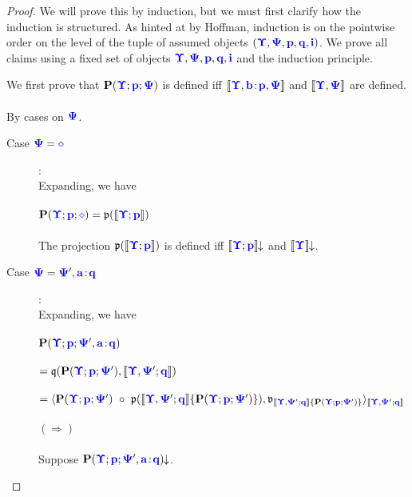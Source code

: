 \documentclass{article}
\newcommand{\blu}[1]{\mathbf{\color{blue}{#1}}}
\newcommand{\mbf}{\mathbf}
\newcommand{\sem}[1]{\llbracket #1 \rrbracket}
\newcommand{\isdef}{\! \! \downarrow}
\begin{document}
\begin{proof}
We will prove this by induction, but we must first clarify how the induction is structured. As hinted at by Hoffman, induction is on the pointwise order on the level of the tuple of assumed objects $(\blu{\Upsilon},\blu{\Psi},\blu{p},\blu{q},\blu{i})$. We prove all claims using a fixed set of objects $\blu{\Upsilon},\blu{\Psi},\blu{p},\blu{q},\blu{i}$ and the induction principle.

We first prove that $\mbf{P}(\blu{\Upsilon};\blu{p};\blu{\Psi})$ is defined iff $\sem{\blu{\Upsilon}, \blu{b \! : \! p}, \blu{\Psi}}$ and $\sem{\blu{\Upsilon}, \blu{\Psi}}$ are defined.\\~\\
By cases on $\blu{\Psi}$.
\begin{description}
\item[Case $\blu{\Psi} = \blu{\diamond}$]:~\\
Expanding, we have\\~\\
$\mbf{P}(\blu{\Upsilon};\blu{p};\blu{\diamond}) = \frak p(\sem{\blu{\Upsilon};\blu{p}})$\\~\\
The projection $\frak p(\sem{\blu{\Upsilon};\blu{p}})$ is defined iff $\sem{\blu{\Upsilon};\blu{p}} \isdef$ and $\sem{\blu{\Upsilon}} \isdef$.
\item[Case $\blu{\Psi} = \blu{\Psi}',\blu{a \! : \! q}$]:~\\

Expanding, we have\\~\\
$\mbf{P}(\blu{\Upsilon} ; \blu{p} ; \blu{\Psi}', \blu{a \! : \! q})$ \\~\\
$= \frak q(\mbf{P}(\blu{\Upsilon};\blu{p};\blu{\Psi}'),\sem{\blu{\Upsilon},\blu{\Psi}';\blu{q}})$ \\~\\
$= \langle \mbf{P}(\blu{\Upsilon};\blu{p};\blu{\Psi}')~\circ~\frak p(\sem{\blu{\Upsilon},\blu{\Psi}';\blu{q}} \{ \mbf{P}(\blu{\Upsilon};\blu{p};\blu{\Psi}') \}), \frak v_{\sem{\blu{\Upsilon},\blu{\Psi}';\blu{q}} \{ \mbf{P}(\blu{\Upsilon};\blu{p};\blu{\Psi}') \}} \rangle_{\sem{\blu{\Upsilon},\blu{\Psi}';\blu{q}}} $\\~\\
$(\Rightarrow)$\\~\\
Suppose $\mbf{P}(\blu{\Upsilon};\blu{p};\blu{\Psi}',\blu{a \! : \! q}) \isdef$.


\end{description}
\end{proof}
\end{document}
